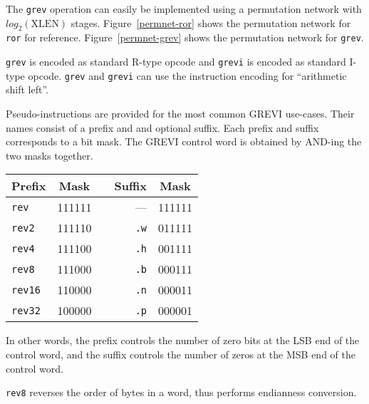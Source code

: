 The {\tt grev} operation can easily be implemented using a permutation
network with $log_2(\textrm{XLEN})$ stages. Figure~\ref{permnet-ror}
shows the permutation network for {\tt ror} for reference.
Figure~\ref{permnet-grev} shows the permutation network for {\tt grev}.

\texttt{grev} is encoded as standard R-type opcode and \texttt{grevi} is
encoded as standard I-type opcode. \texttt{grev} and \texttt{grevi} can
use the instruction encoding for ``arithmetic shift left''.

Pseudo-instructions are provided for the most common GREVI use-cases. Their names
consist of a prefix and and optional suffix. Each prefix and suffix corresponds
to a bit mask. The GREVI control word is obtained by AND-ing the two masks together.

\begin{center}
\begin{tabular}{lcp{1cm}rc}
Prefix & Mask & & Suffix & Mask \\
\hline
{\tt rev}   & 111111 & &      --- & 111111 \\
{\tt rev2}  & 111110 & & {\tt .w} & 011111 \\
{\tt rev4}  & 111100 & & {\tt .h} & 001111 \\
{\tt rev8}  & 111000 & & {\tt .b} & 000111 \\
{\tt rev16} & 110000 & & {\tt .n} & 000011 \\
{\tt rev32} & 100000 & & {\tt .p} & 000001 \\
\end{tabular}
\end{center}

In other words, the prefix controls the number of zero bits at the LSB end of the
control word, and the suffix controls the number of zeros at the MSB end of the control
word.

{\tt rev8} reverses the order of bytes in a word, thus performs endianness conversion.

%
%
%


